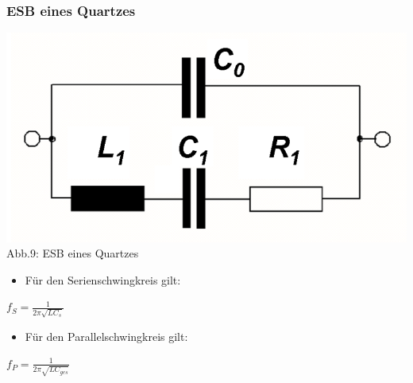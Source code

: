 \begin{frame}
\frametitle{ESB eines Quartzes}
\begin{center}
	\includegraphics[scale=0.3]{a04/Quartz-ESB.png}\\
	Abb.9: ESB eines Quartzes \cite{wpde}
\end{center}
\begin{itemize}
	\item	Für den Serienschwingkreis gilt:
\end{itemize}
\begin{Large}
	\begin{center}
		$f_S = \frac{1}{2 \pi \sqrt{L C_{s}}}$
	\end{center}
\end{Large}
\begin{itemize}
	\item	Für den Parallelschwingkreis gilt:
\end{itemize}
\begin{Large}
	\begin{center}
		$f_P = \frac{1}{2 \pi \sqrt{L C_{ges}}}$
	\end{center}
\end{Large}
\end{frame}

